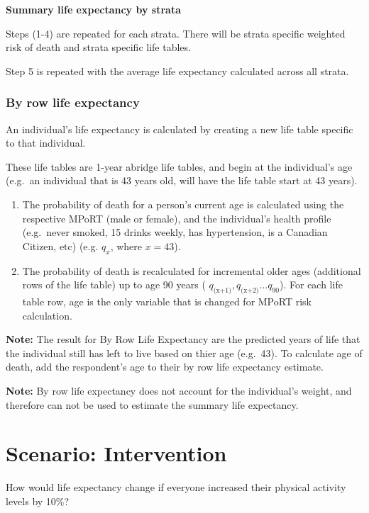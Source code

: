 \documentclass[]{book}
\begin{document}
\textbf{Summary life expectancy by strata}

Steps (1-4) are repeated for each strata. There will be strata specific
weighted risk of death and strata specific life tables.

Step 5 is repeated with the average life expectancy calculated across
all strata.

\subsubsection{By row life expectancy}\label{by-row-life-expectancy}

An individual's life expectancy is calculated by creating a new life
table specific to that individual.

These life tables are 1-year abridge life tables, and begin at the
individual's age (e.g.~an individual that is 43 years old, will have the
life table start at 43 years).

\begin{enumerate}
\def\labelenumi{\arabic{enumi}.}
\item
  The probability of death for a person's current age is calculated
  using the respective MPoRT (male or female), and the individual's
  health profile (e.g.~never smoked, 15 drinks weekly, has hypertension,
  is a Canadian Citizen, etc) (e.g. \(q_x\), where \(x=43\)).
\item
  The probability of death is recalculated for incremental older ages
  (additional rows of the life table) up to age 90 years (
  \(q_\text{(x+1)}, q_\text{(x+2)}...q_{90}\)). For each life table row,
  age is the only variable that is changed for MPoRT risk calculation.
\end{enumerate}

\textbf{Note:} The result for By Row Life Expectancy are the predicted
years of life that the individual still has left to live based on thier
age (e.g.~43). To calculate age of death, add the respondent's age to
their by row life expectancy estimate.

\textbf{Note:} By row life expectancy does not account for the
individual's weight, and therefore can not be used to estimate the
summary life expectancy.

\section{Scenario: Intervention}\label{scenario-intervention}

How would life expectancy change if everyone increased their physical
activity levels by 10\%?
\end{document}
